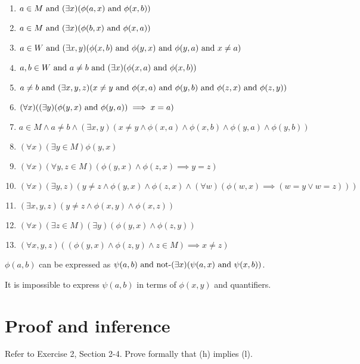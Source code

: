 \begin{solution}
\begin{enumerate}[label=(\alph*)]
    \item $a\in M\land (\exists x)\prn{\phi(a,x)\land \phi(x, b)}$
    \item $a\in M\land (\exists x)\prn{\phi(b,x)\land \phi(x, a)}$
    \item $a\in W\land (\exists x, y)\prn{\phi(x,b)\land \phi(y, x)\land \phi(y,a)\land x\neq a}$
    \item $a,b\in W\land a\neq b\land (\exists x)\prn{\phi(x, a)\land \phi(x, b)}$
    \item $a\neq b\land (\exists x, y, z)\prn{x\neq y\land \phi(x,a)\land \phi(y,b)\land \phi(z, x)\land \phi(z,y)}$
    \item $(\forall x)\prn{(\exists y)(\phi(y,x)\land \phi(y, a))\implies x = a}$
    \item $a\in M\land a\neq b\land (\exists x,y)(x\neq y\land \phi(x,a)\land \phi(x,b)\land \phi(y,a)\land \phi(y,b))$
    \item $(\forall x)(\exists y\in M)\phi(y, x)$
    \item $(\forall x)(\forall y,z\in M)(\phi(y, x)\land \phi(z,x) \implies y = z)$
    \item $(\forall x)(\exists y,z)(y\neq z\land \phi(y, x)\land \phi(z,x)
    \land (\forall w)(\phi(w,x)\implies (w=y\lor w=z)))$
    \item $(\exists x,y,z)(y\neq z\land \phi(x,y)\land \phi(x,z))$
    \item $(\forall x)(\exists z\in M)(\exists y)(\phi(y, x)\land \phi(z,y))$
    \item $(\forall x,y,z)((\phi(y, x)\land \phi(z,y)\land z\in M) \implies x\neq z)$
\end{enumerate}

$\phi(a,b)$ can be expressed as $\psi(a,b)\text{ and } \text{not-}(\exists x)(\psi(a,x)\text{ and } \psi(x,b))$.

It is impossible to express $\psi(a, b)$ in terms of $\phi(x, y)$ and quantifiers.
\end{solution}


\section{Proof and inference}

\begin{exercise}
Refer to Exercise 2, Section 2-4. Prove formally that (h) implies (l).
\end{exercise}

